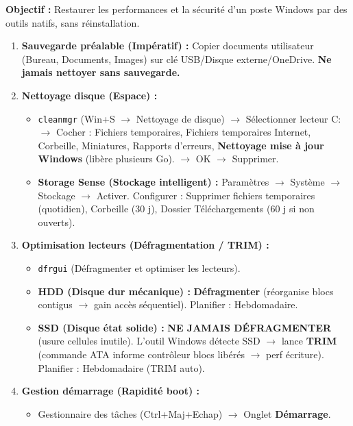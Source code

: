 \documentclass[11pt]{article}
\begin{document}
\begin{methode}
    \textbf{Objectif :} Restaurer les performances et la sécurité d'un poste Windows par des outils natifs, sans réinstallation.
    \begin{enumerate}
        \item \textbf{Sauvegarde préalable (Impératif) :} Copier documents utilisateur (Bureau, Documents, Images) sur clé USB/Disque externe/OneDrive. \textbf{Ne jamais nettoyer sans sauvegarde.}
        \item \textbf{Nettoyage disque (Espace) :}
              \begin{itemize}
                  \item \texttt{cleanmgr} (Win+S $\rightarrow$ Nettoyage de disque) $\rightarrow$ Sélectionner lecteur C: $\rightarrow$ Cocher : Fichiers temporaires, Fichiers temporaires Internet, Corbeille, Miniatures, Rapports d'erreurs, \textbf{Nettoyage mise à jour Windows} (libère plusieurs Go). $\rightarrow$ OK $\rightarrow$ Supprimer.
                  \item \textbf{Storage Sense (Stockage intelligent) :} Paramètres $\rightarrow$ Système $\rightarrow$ Stockage $\rightarrow$ Activer. Configurer : Supprimer fichiers temporaires (quotidien), Corbeille (30 j), Dossier Téléchargements (60 j si non ouverts).
              \end{itemize}
        \item \textbf{Optimisation lecteurs (Défragmentation / TRIM) :}
              \begin{itemize}
                  \item \texttt{dfrgui} (Défragmenter et optimiser les lecteurs).
                  \item \textbf{HDD (Disque dur mécanique) :} \textbf{Défragmenter} (réorganise blocs contigus $\rightarrow$ gain accès séquentiel). Planifier : Hebdomadaire.
                  \item \textbf{SSD (Disque état solide) :} \textbf{NE JAMAIS DÉFRAGMENTER} (usure cellules inutile). L'outil Windows détecte SSD $\rightarrow$ lance \textbf{TRIM} (commande ATA informe contrôleur blocs libérés $\rightarrow$ perf écriture). Planifier : Hebdomadaire (TRIM auto).
              \end{itemize}
        \item \textbf{Gestion démarrage (Rapidité boot) :}
              \begin{itemize}
                  \item Gestionnaire des tâches (Ctrl+Maj+Echap) $\rightarrow$ Onglet \textbf{Démarrage}.

\end{itemize}
\end{enumerate}
\end{methode}
\end{document}
